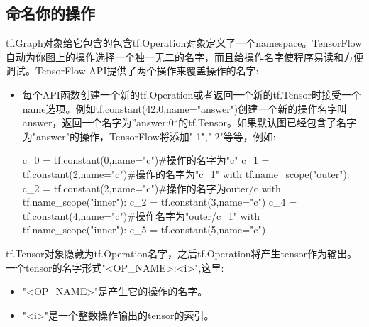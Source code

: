 \subsection{命名你的操作}
tf.Graph对象给它包含的包含tf.Operation对象定义了一个namespace。TensorFlow自动为你图上的操作选择一个独一无二的名字，而且给操作名字使程序易读和方便调试。TensorFlow API提供了两个操作来覆盖操作的名字:
\begin{itemize}
\item 每个API函数创建一个新的tf.Operation或者返回一个新的tf.Tensor时接受一个name选项。例如tf.constant(42.0,name="answer")创建一个新的操作名字叫answer，返回一个名字为”answer:0“的tf.Tensor。如果默认图已经包含了名字为"answer"的操作，TensorFlow将添加"-1","-2"等等，例如:
\begin{python}
c_0 = tf.constant(0,name="c")#操作的名字为"c"
c_1 = tf.constant(2,name="c")#操作的名字为"c_1"
with tf.name_scope("outer"):
    c_2 = tf.constant(2,name="c")#操作的名字为outer/c
    with tf.name_scope("inner"):
        c_2 = tf.constant(3,name="c")
    c_4 = tf.constant(4,name="c")#操作名字为"outer/c_1"
    with tf.name_scope("inner"):
        c_5 = tf.constant(5,name="c")
\end{python}
\end{itemize}
tf.Tensor对象隐藏为tf.Operation名字，之后tf.Operation将产生tensor作为输出。一个tensor的名字形式"<OP\_NAME>:<i>",这里:
\begin{itemize}
\item "<OP\_NAME>"是产生它的操作的名字。
\item "<i>"是一个整数操作输出的tensor的索引。
\end{itemize}
